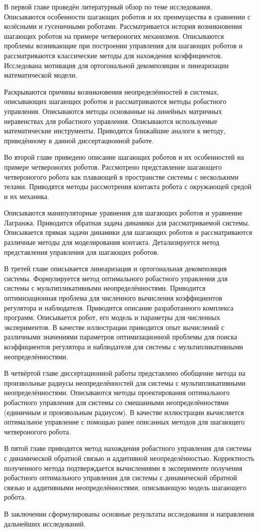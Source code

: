 В первой главе проведён литературный обзор по теме исследования. Описываются особенности шагающих роботов и их преимущества в сравнении с колёсными и гусеничными роботами. Рассматривается история возникновения шагающих роботов на примере четвероногих механизмов. Описываются проблемы возникающие при построении управления для шагающих роботов и рассматриваются классические методы для нахождения коэффициентов. Исследована мотивация для ортогональной декомпозиции и линеаризации математической модели. 

Раскрываются причины возникновения неопределённостей в системах, описывающих шагающих роботов и рассматриваются методы робастного управления. 
Описываются методы основанные на линейных матричных неравенствах для робастного управления. Описываются используемые математические инструменты. Приводятся ближайшие аналоги к методу, приведённому в данной диссертационной работе.

Во второй главе приведено описание шагающих роботов и их особенностей на примере четвероногих роботов. Рассмотрено представление шагающего четвероногого робота как плавающей в пространстве системы с несколькими телами. Приводятся методы рассмотрения контакта робота с окружающей средой и их механика. 

Описываются манипуляторные уравнения для шагающих роботов и уравнение Лагранжа. Приводится обратная задача динамики для рассматриваемой системы. Описывается прямая задачи динамики для шагающих роботов и рассматриваются различные методы для моделирования контакта. Детализируется метод представления управления для шагающих роботов.

В третей главе описывается линеаризация и ортогональная декомпозиция системы. Формулируется метод оптимального робастного управления для системы с мультипликативными неопределённостями. Приводится оптимизационная проблема для численного вычисления коэффициентов регулятора и наблюдателя. Приводится описание разработанного комплекса программ. Описывается робот, его модель и параметры для численных экспериментов. В качестве иллюстрации приводится опыт вычислений с различными значениями параметров оптимизационной проблемы для поиска коэффициентов регулятора и наблюдателя для системы с мультипликативными неопределённостями. 

В четвёртой главе диссертационной работы представлено обобщение метода на произвольные радиусы неопределённостей для системы с мультипликативными неопределённостями. Описываются методы проектирования оптимального робастного управления для системы со смешанными неопределённостями (единичным и произвольным радиусом). В качестве иллюстрации вычисляется оптимальное управление с помощью ранее описанных методов для шагающего четвероногого робота.

В пятой главе приводится метод нахождения робастного управления для системы с динамической обратной связью и аддитивной неопределённостью. Корректность полученного метода подтверждается вычислениями в эксперименте получения робастного оптимального управления для системы с динамической обратной связью и аддитивными неопределённостями, описывающую модель шагающего робота.

В заключении сформулированы основные результаты исследования и направления дальнейших исследований.